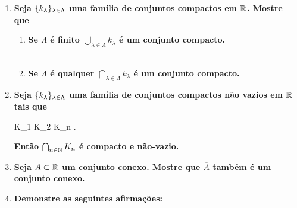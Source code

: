 \documentclass[%
  a4paper,%
  12pt,%
  fleqn,%
  english,%
  brazilian,%
]{article}
\begin{document}
\begin{enumerate}[wide, labelwidth=!, labelindent=0pt]
	\item 	\textbf{Seja $\{k_\lambda\}_{\lambda \in \Lambda}$ uma família de conjuntos compactos em $\mathbb R$. Mostre que}
	\begin{enumerate}[label=\alph*)]
		\item \textbf{Se $\Lambda$ é finito $\bigcup_{\lambda \in \Lambda} k_{\lambda}$ é um conjunto compacto.}\\
    \\
		\item \textbf{Se $\Lambda$ é qualquer $\bigcap_{\lambda \in \Lambda} k_{\lambda}$ é um conjunto compacto.}\\
	\end{enumerate}
	\item \textbf{Seja $\{k_\lambda\}_{\lambda \in \Lambda}$ uma família de conjuntos compactos não vazios em $\mathbb R$ tais que}
	\begin{ceqnalign*}
		K_1 \supset K_2 \supset \cdots \supset K_n \supset \cdots.
	\end{ceqnalign*} 
	\textbf{Então $\bigcap_{n \in \mathbb N} K_n$ é compacto e não-vazio.}
	\item \textbf{Seja $A \subset \mathbb R$ um conjunto conexo. Mostre que $\overline A$ também é um conjunto conexo.}
	\item\textbf{ Demonstre as seguintes afirmações:}


\end{enumerate}
\end{document}
